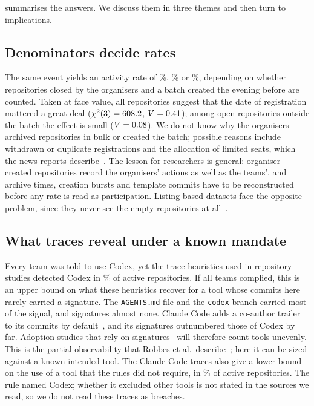 \documentclass{article}
\begin{document}
 summarises the answers. We discuss them in three themes and then turn to implications.

\subsection{Denominators decide rates}
The same event yields an activity rate of \NRqOneActivePct\%, \NRqOneActiveOfOpenPct\% or \NRqOneActiveOfOpenNonbatchPct\%, depending on whether repositories closed by the organisers and a batch created the evening before are counted. Taken at face value, all repositories suggest that the date of registration mattered a great deal ($\chi^2(\num{3}) = \num{608.2}$, $V = \num{0.41}$); among open repositories outside the batch the effect is small ($V = \num{0.08}$). We do not know why the organisers archived repositories in bulk or created the batch; possible reasons include withdrawn or duplicate registrations and the allocation of limited seats, which the news reports describe~\cite{qumash2026queue,ulys2026survival}. The lesson for researchers is general: organiser-created repositories record the organisers' actions as well as the teams', and archive times, creation bursts and template commits have to be reconstructed before any rate is read as participation. Listing-based datasets face the opposite problem, since they never see the empty repositories at all~\cite{imam2021secretlife,mahmoud2022oneoff}.

\subsection{What traces reveal under a known mandate}
Every team was told to use Codex, yet the trace heuristics used in repository studies detected Codex in \NRqTwoTracesCodexAnyPct\% of active repositories. If all teams complied, this is an upper bound on what these heuristics recover for a tool whose commits here rarely carried a signature. The \texttt{AGENTS.md} file and the \texttt{codex} branch carried most of the signal, and signatures almost none. Claude Code adds a co-author trailer to its commits by default~\cite{claudecode2026attribution}, and its signatures outnumbered those of Codex by far. Adoption studies that rely on signatures~\cite{li2025aidev,robbes2026agenticmuch} will therefore count tools unevenly. This is the partial observability that Robbes et al.\ describe~\cite{robbes2026heuristics}; here it can be sized against a known intended tool. The Claude Code traces also give a lower bound on the use of a tool that the rules did not require, in \NRqTwoTracesClaudeAnyPct\% of active repositories. The rule named Codex; whether it excluded other tools is not stated in the sources we read, so we do not read these traces as breaches.
\end{document}
